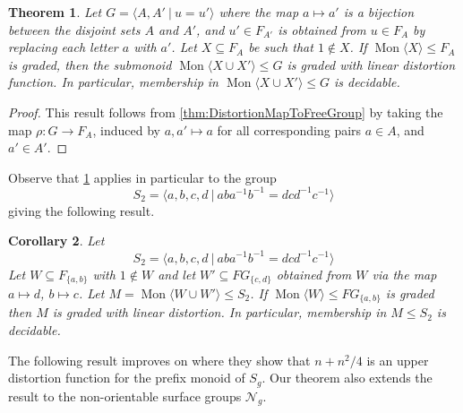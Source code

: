 \documentclass[11pt]{amsart}
\newcommand{\Mgen}[1]{\operatorname{Mon}\bigl\langle #1 \bigr\rangle}
\newcommand{\Gpres}[2]{\bigl\langle #1\:|\:#2 \bigr\rangle}
\theoremstyle{plain}
\newtheorem{theorem}{Theorem}[section]
\newtheorem{cor}[theorem]{Corollary}
\theoremstyle{definition}
\begin{document}
\begin{theorem}\label{thm:S2matchedAdapted}
Let
$
G = \Gpres{A, A'}{u = u'}
$
where the map $a \mapsto a'$ is a bijection between the disjoint sets $A$ and $A'$, and $u' \in F_{A'}$ is obtained from $u \in F_A$ by replacing each letter $a$ with $a'$. Let $X \subseteq F_A$ be such that $1 \notin X$. If $\Mgen{X} \leq F_A$ is graded, then the submonoid $\Mgen{X \cup X'} \leq G$ is graded with linear distortion function. 
In particular, membership in $\Mgen{X \cup X'} \leq G$ is decidable.
\end{theorem}
\begin{proof}
This result follows from \cref{thm:DistortionMapToFreeGroup} by taking the 
map $\rho \colon G \rightarrow F_A$, induced by $a, a' \mapsto a$ for all corresponding pairs $a \in A$, and $a' \in A'$. 
\end{proof}





Observe that 
\cref{thm:S2matchedAdapted} 
applies in particular to the group
\[
S_2 = \Gpres{a,b,c,d}{aba^{-1}b^{-1} = dcd^{-1}c^{-1}}
\]
giving the following result.  

\begin{cor}\label{thm:S2matchedNew}
Let 
   \[
S_2 = \Gpres{a,b,c,d}{aba^{-1}b^{-1} = dcd^{-1}c^{-1}}
   \] 
Let $W \subseteq F_{ \{ a,b \} }$ with $1 \not\in W$ and let $W' \subseteq FG_{ \{ c,d \}}$ obtained from $W$ via the map $a \mapsto d$, $b \mapsto c$. Let $M = \Mgen{W \cup W'} \leq S_2$. If $\Mgen{W} \leq FG_{\{ a,b \}}$ is graded then $M$ is graded with linear distortion. In particular, membership in $M \leq S_2$ is decidable.    
\end{cor}

The following result improves on \cite[Proposition 2.10]{margolis2005distortion} where they show that $n + n^2/4$ is an upper distortion function for the prefix monoid of $S_g$.
Our theorem also extends the result to the non-orientable surface groups $\mathcal{N}_g$.      
 
\end{document}
